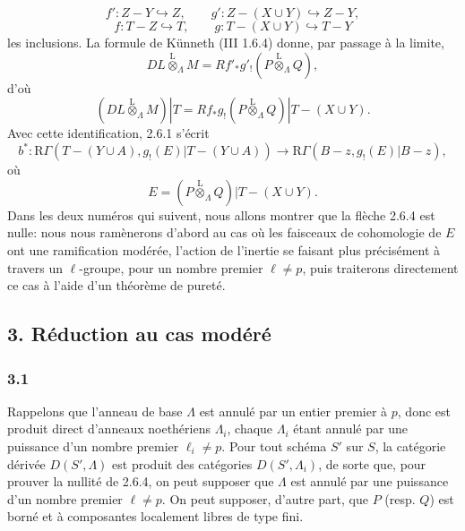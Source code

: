 \documentclass[11pt]{article}
\providecommand{\lten}{\overset{\mathrm L}{\otimes}}
\providecommand{\lten}{\overset{\mathrm L}{\otimes}}
\providecommand{\lten}{\overset{\mathrm L}{\otimes}}
\providecommand{\lten}{\overset{\mathrm L}{\otimes}}
\providecommand{\lten}{\overset{\mathrm L}{\otimes}}
\providecommand{\lten}{\overset{\mathrm L}{\otimes}}
\providecommand{\lten}{\overset{\mathrm L}{\otimes}}
\begin{document}
\[
f':Z-Y\hookrightarrow Z,\qquad
g':Z-(X\cup Y)\hookrightarrow Z-Y,
\]
\[
f:T-Z\hookrightarrow T,\qquad
g:T-(X\cup Y)\hookrightarrow T-Y
\]
les inclusions. La formule de Künneth (III 1.6.4) donne, par passage à la limite,
\[
DL\lten_{\Lambda}M=Rf'_*g'_!(P\lten_{\Lambda}Q),
\]
d'où
\begin{equation}
(DL\lten_{\Lambda}M)|T=Rf_*g_!(P\lten_{\Lambda}Q)|T-(X\cup Y).
\tag{2.6.3}
\end{equation}
Avec cette identification, 2.6.1 s'écrit
\begin{equation}
b^*:\mathrm R\Gamma(T-(Y\cup A),g_!(E)|T-(Y\cup A))
 \longrightarrow \mathrm R\Gamma(B-z,g_!(E)|B-z),
\tag{2.6.4}
\end{equation}
où
\[
E=(P\lten_{\Lambda}Q)|T-(X\cup Y).
\]
Dans les deux numéros qui suivent, nous allons montrer que la flèche 2.6.4 est nulle: nous nous ramènerons d'abord au cas où les faisceaux de cohomologie de $E$ ont une ramification modérée, l'action de l'inertie se faisant plus précisément à travers un $\ell$-groupe, pour un nombre premier $\ell\ne p$, puis traiterons directement ce cas à l'aide d'un théorème de pureté.

\subsection*{3. Réduction au cas modéré}

\subsubsection*{3.1}
Rappelons que l'anneau de base $\Lambda$ est annulé par un entier premier à $p$, donc est produit direct d'anneaux noethériens $\Lambda_i$, chaque $\Lambda_i$ étant annulé par une puissance d'un nombre premier $\ell_i\ne p$. Pour tout schéma $S'$ sur $S$, la catégorie dérivée $D(S',\Lambda)$ est produit des catégories $D(S',\Lambda_i)$, de sorte que, pour prouver la nullité de 2.6.4, on peut supposer que $\Lambda$ est annulé par une puissance d'un nombre premier $\ell\ne p$. On peut supposer, d'autre part, que $P$ (resp. $Q$) est borné et à composantes localement libres de type fini.
\end{document}

